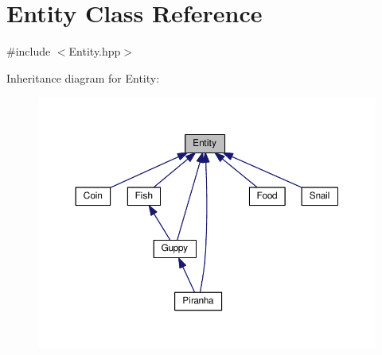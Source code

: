 \hypertarget{classEntity}{}\section{Entity Class Reference}
\label{classEntity}


{\ttfamily \#include $<$Entity.\+hpp$>$}



Inheritance diagram for Entity\+:\nopagebreak
\begin{figure}[H]
\begin{center}
\leavevmode
\includegraphics[width=350pt]{classEntity__inherit__graph}
\end{center}
\end{figure}
